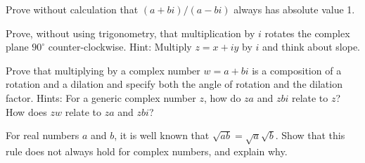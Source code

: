 \documentclass[space,nooutcomes]{ximera}
\begin{document}
\begin{problem}
Prove without calculation that $(a+bi)/(a-bi)$ always has absolute value 1.  
\vfill 
\end{problem}

%
%
%
%

\begin{problem}
Prove, without using trigonometry, that multiplication by $i$ rotates the complex plane $90^{\circ}$ counter-clockwise.  Hint: Multiply $z=x+iy$ by $i$ and think about slope.
\vfill 
\end{problem}

\begin{problem}
Prove that multiplying by a complex number $w = a + bi$ is a composition of a rotation and a dilation and specify both the angle of rotation and the dilation factor.  Hints: For a generic complex number $z$, how do $za$ and $zbi$ relate to $z$?  How does $zw$ relate to $za$ and $zbi$?  
\vfill 
\end{problem}

\begin{problem}
For real numbers $a$ and $b$, it is well known that $\sqrt{ab}=\sqrt{a}\sqrt{b}$.  Show that this rule does not always hold for complex numbers, and explain why.  
\vfill 
\end{problem}
\end{document}

